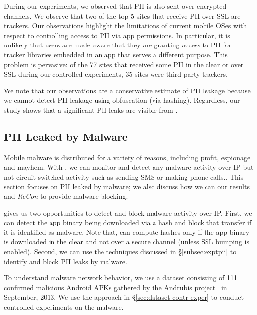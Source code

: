 During our experiments, we observed that PII is also sent over encrypted channels.  
We observe that two of the top 5 sites that receive PII over SSL are trackers.
Our observations highlight the limitations of current mobile OSes with respect to controlling access to PII via app permissions. 
In particular, it is unlikely that users are made aware that they are granting access to PII for tracker libraries embedded in an app that serves a different purpose. 
This problem is pervasive: of the 77 sites that received some PII in the clear or over SSL during our controlled experiments, 35 sites were third party trackers.

We note that our observations are a conservative estimate of PII leakage 
because we cannot detect PII leakage using obfuscation (\eg via hashing). 
Regardless, our study shows that a significant PII leaks are  
visible from \meddle. 

\subsection{PII Leaked by Malware}
\label{subsec:malware}

Mobile malware is distributed for a variety of reasons, including profit, espionage and mayhem. With  
\meddle, we can monitor and detect any malware activity over IP but not circuit switched activity such as 
sending SMS or making phone calls.. This section focuses on PII leaked by malware; 
we also discuss how we can our results and \emph{ReCon} to provide malware blocking.

\meddle gives us two opportunities to detect and block malware activity over IP. 
First, we can detect the app binary being downloaded via a hash and block that transfer if it is identified as malware. 
Note that, \meddle can compute hashes only if the app binary is downloaded in the clear and not over a secure channel (unless SSL bumping is enabled).
Second, we can use the techniques discussed in \S\ref{subsec:exptpii} to identify and block PII leaks by malware. 

To understand malware network behavior, we use a dataset consisting of 111 confirmed malicious Android APKs 
gathered by the Andrubis project~\cite{andrubis} in September, 2013.  
We use the approach in \S\ref{sec:dataset-contr-exper} to conduct controlled experiments on the malware.

